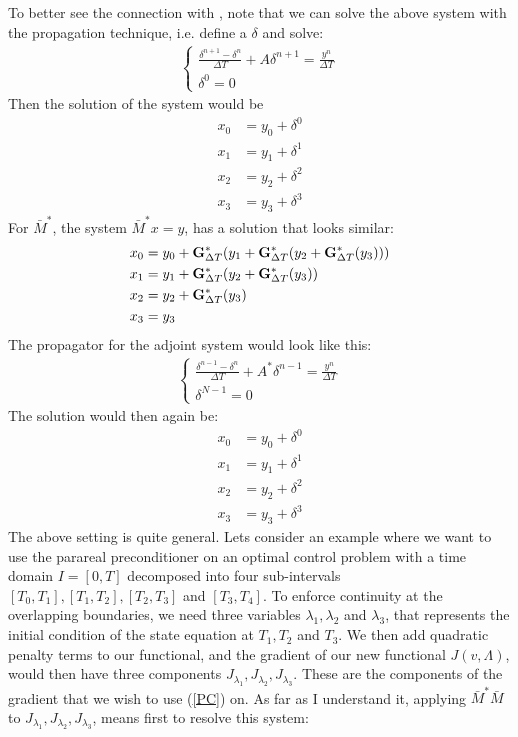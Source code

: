 \documentclass[11pt,a4paper]{article}
\begin{document}
To better see the connection with \cite{lions2001resolution}, note that we can solve the above system with the propagation technique, i.e. define a $\delta$ and solve:
\begin{align}
\left\{
     \begin{array}{lr}
		\frac{\delta^{n+1} -\delta^n }{\Delta T } + A\delta^{n+1} = \frac{y^n}{\Delta T} \\
		\delta^0 = 0
	\end{array} \right.
\end{align} 
Then the solution of the system would be 
\begin{align*}
x_0 &=y_0 +\delta^0\\
x_1 &=y_1 + \delta^1 \\
x_2 &=y_2 +\delta^2\\
x_3 &=y_3 + \delta^3 
\end{align*}
For $\bar{M}^{*}$, the system $\bar{M}^{*}x=y$, has a solution that looks similar:
\begin{align*}
x_0 &=y_0 +\bold{G}_{\Delta T}^*(y_1 + \bold{G}_{\Delta T}^*(y_2 + \bold{G}_{\Delta T}^*(y_ 3)))\\
x_1 &=y_1 + \bold{G}_{\Delta T}^*(y_2 + \bold{G}_{\Delta T}^*(y_ 3))\\
x_2 &=y_2 + \bold{G}_{\Delta T}^*(y_ 3) \\
x_3 &=y_3 
\end{align*}
The propagator for the adjoint system would look like this:
\begin{align}
\left\{
     \begin{array}{lr}
		\frac{\delta^{n-1} -\delta^n }{\Delta T } + A^*\delta^{n-1} = \frac{y^n}{\Delta T} \\
		\delta^{N-1} = 0
	\end{array} \right.
\end{align} 
The solution would then again be:
\begin{align*}
x_0 &=y_0 +\delta^0\\
x_1 &=y_1 + \delta^1 \\
x_2 &=y_2 +\delta^2\\
x_3 &=y_3 + \delta^3 
\end{align*}
The above setting is quite general. Lets consider an example where we want to use the parareal preconditioner on an optimal control problem with a time domain $I=[0,T]$ decomposed into four sub-intervals $[T_0,T_1], [T_1,T_2], [T_2,T_3]$ and $[T_3,T_4]$. To enforce continuity at the overlapping boundaries, we need three variables $\lambda_1,\lambda_2$ and $\lambda_3$, that represents the initial condition of the state equation at $T_1,T_2$ and $T_3$. We then add quadratic penalty terms to our functional, and the gradient of our new functional $J(v,\Lambda)$, would then have three components $J_{\lambda_1}, J_{\lambda_2}, J_{\lambda_3}$. These are the components of the gradient that we wish to use (\ref{PC}) on. As far as I understand it, applying $\bar{M}^{*}\bar{M}$ to $J_{\lambda_1}, J_{\lambda_2}, J_{\lambda_3}$, means first to resolve this system:
\end{document}
